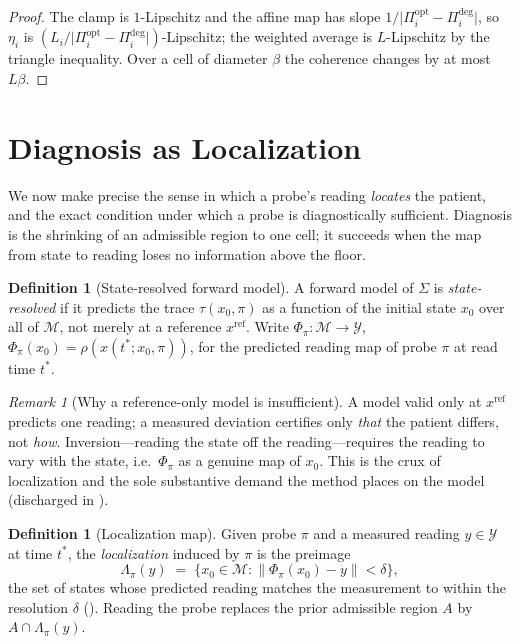 \documentclass[11pt,a4paper]{article}
\theoremstyle{cfcthm}
\theoremstyle{definition}
\newtheorem{definition}[theorem]{Definition}
\theoremstyle{remark}
\newtheorem{remark}[theorem]{Remark}
\newcommand{\Man}{\mathcal{M}}          %
\newcommand{\st}{x}                     %
\newcommand{\flo}{\beta}                %
\newcommand{\probe}{\pi}                %
\newcommand{\trace}{\tau}               %
\newcommand{\Rd}{\rho}                  %
\newcommand{\fwd}{\Phi}                 %
\newcommand{\loc}{\Lambda}              %
\newcommand{\ecoh}{\eta}                %
\newcommand{\abs}[1]{\lvert#1\rvert}
\newcommand{\norm}[1]{\lVert#1\rVert}
\newcommand{\set}[1]{\{#1\}}
\begin{document}
\begin{proof}
The clamp is $1$-Lipschitz and the affine map has slope
$1/\abs{\Pi_i^{\mathrm{opt}}-\Pi_i^{\mathrm{deg}}}$, so
$\ecoh_i$ is $(L_i/\abs{\Pi_i^{\mathrm{opt}}-\Pi_i^{\mathrm{deg}}})$-Lipschitz;
the weighted average is $L$-Lipschitz by the triangle inequality. Over a cell
of diameter $\flo$ the coherence changes by at most $L\flo$.
\end{proof}

\section{Diagnosis as Localization}
\label{sec:diagnosis}

We now make precise the sense in which a probe's reading \emph{locates} the
patient, and the exact condition under which a probe is diagnostically
sufficient. Diagnosis is the shrinking of an admissible region to one cell; it
succeeds when the map from state to reading loses no information above the
floor.

\begin{definition}[State-resolved forward model]
\label{def:stateresolved}
A forward model of $\Sigma$ is \emph{state-resolved} if it predicts the trace
$\trace(\st_0,\probe)$ as a function of the initial state $\st_0$ over all of
$\Man$, not merely at a reference $\st^{\mathrm{ref}}$. Write
$\fwd_\probe\colon\Man\to\mathcal{Y}$,
$\fwd_\probe(\st_0)=\Rd(\st(t^{\ast};\st_0,\probe))$, for the predicted reading
map of probe $\probe$ at read time $t^{\ast}$.
\end{definition}

\begin{remark}[Why a reference-only model is insufficient]
\label{rem:reference}
A model valid only at $\st^{\mathrm{ref}}$ predicts one reading; a measured
deviation certifies only \emph{that} the patient differs, not \emph{how}.
Inversion---reading the state off the reading---requires the reading to vary
with the state, i.e.\ $\fwd_\probe$ as a genuine map of $\st_0$. This is the
crux of localization and the sole substantive demand the method places on the
model (discharged in ).
\end{remark}

\begin{definition}[Localization map]
\label{def:loc}
Given probe $\probe$ and a measured reading $y\in\mathcal{Y}$ at time
$t^{\ast}$, the \emph{localization} induced by $\probe$ is the preimage
\begin{equation}
\loc_\probe(y)\;=\;\set{\st_0\in\Man:\norm{\fwd_\probe(\st_0)-y}<\delta},
\label{eq:loc}
\end{equation}
the set of states whose predicted reading matches the measurement to within the
resolution $\delta$ (). Reading the probe replaces the prior
admissible region $A$ by $A\cap\loc_\probe(y)$.
\end{definition}
\end{document}
